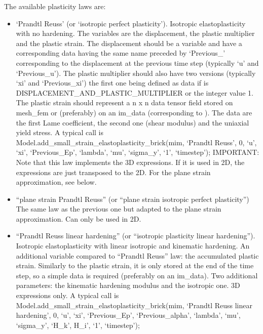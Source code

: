 \documentclass[a4paper,11pt,english]{sphinxmanual}
\begin{document}
\begin{fulllineitems}
\begin{fulllineitems}
The available plasticity laws are:
\begin{itemize}
\item {} 
‘Prandtl Reuss’ (or ‘isotropic perfect plasticity’).
Isotropic elasto\sphinxhyphen{}plasticity with no hardening. The variables are the
displacement, the plastic multiplier and the plastic strain.
The displacement should be a variable and have a corresponding data
having the same name preceded by ‘Previous\_’ corresponding to the
displacement at the previous time step (typically ‘u’ and ‘Previous\_u’).
The plastic multiplier should also have two versions (typically ‘xi’
and ‘Previous\_xi’) the first one being defined as data if
 is DISPLACEMENT\_AND\_PLASTIC\_MULTIPLIER
or the integer value 1.
The plastic strain should represent a n x n data tensor field stored
on mesh\_fem or (preferably) on an im\_data (corresponding to ).
The data are the first Lame coefficient, the second one (shear modulus)
and the uniaxial yield stress. A typical call is
Model.add\_small\_strain\_elastoplasticity\_brick(mim, ‘Prandtl Reuss’, 0, ‘u’, ‘xi’, ‘Previous\_Ep’, ‘lambda’, ‘mu’, ‘sigma\_y’, ‘1’, ‘timestep’);
IMPORTANT: Note that this law implements
the 3D expressions. If it is used in 2D, the expressions are just
transposed to the 2D. For the plane strain approximation, see below.

\item {} 
“plane strain Prandtl Reuss”
(or “plane strain isotropic perfect plasticity”)
The same law as the previous one but adapted to the plane strain
approximation. Can only be used in 2D.

\item {} 
“Prandtl Reuss linear hardening”
(or “isotropic plasticity linear hardening”).
Isotropic elasto\sphinxhyphen{}plasticity with linear isotropic and kinematic
hardening. An additional variable compared to “Prandtl Reuss” law:
the accumulated plastic strain. Similarly to the plastic strain, it
is only stored at the end of the time step, so a simple data is
required (preferably on an im\_data).
Two additional parameters: the kinematic hardening modulus and the
isotropic one. 3D expressions only. A typical call is
Model.add\_small\_strain\_elastoplasticity\_brick(mim, ‘Prandtl Reuss linear hardening’, 0, ‘u’, ‘xi’, ‘Previous\_Ep’, ‘Previous\_alpha’, ‘lambda’, ‘mu’, ‘sigma\_y’, ‘H\_k’, H\_i’, ‘1’, ‘timestep’);


\end{itemize}
\end{fulllineitems}
\end{fulllineitems}
\end{document}
